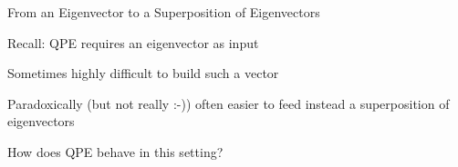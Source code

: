 \documentclass{beamer}
\begin{document}
\begin{frame}{From an Eigenvector to a Superposition of Eigenvectors}

        Recall: QPE requires an \alert{eigenvector} as input

        Sometimes \alert{highly difficult} to build such a vector

        Paradoxically (but not really :-)) 
        often easier to feed instead a superposition of eigenvectors

        \pause
        \vspace{0.8cm}
        How does QPE behave in this setting?


\end{frame}
\end{document}
